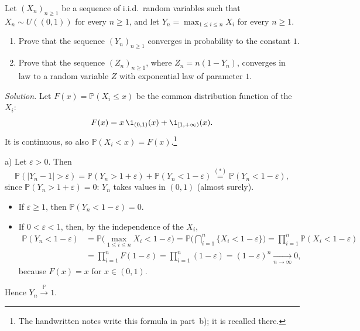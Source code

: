 \begin{example}\label{exa:cl-maximum}
Let $(X_n)_{n\ge1}$ be a sequence of i.i.d.\ random variables such that $X_n\sim U((0,1))$ for
every $n\ge1$, and let $Y_n=\max_{1\le i\le n}X_i$ for every $n\ge1$.
\begin{enumerate}[label=\alph*)]
  \item Prove that the sequence $(Y_n)_{n\ge1}$ converges in probability to the constant $1$.
  \item Prove that the sequence $(Z_n)_{n\ge1}$, where $Z_n=n(1-Y_n)$, converges in law to a
    random variable $Z$ with exponential law of parameter $1$.
\end{enumerate}

\emph{Solution.} Let $F(x)=\mathbb P(X_i\le x)$ be the common distribution function of the
$X_i$:
\[
  F(x)=x\,\1_{(0,1)}(x)+\1_{[1,+\infty)}(x).
\]
It is continuous, so also $\mathbb P(X_i<x)=F(x)$.\footnote{The handwritten notes write this
formula in part~b); it is recalled there.}

a) Let $\varepsilon>0$. Then
\[
  \mathbb P(|Y_n-1|>\varepsilon)=\mathbb P(Y_n>1+\varepsilon)+\mathbb P(Y_n<1-\varepsilon)
  \overset{(\ast)}{=}\mathbb P(Y_n<1-\varepsilon),
\]
since $\mathbb P(Y_n>1+\varepsilon)=0$: $Y_n$ takes values in $(0,1)$ (almost surely).
\begin{itemize}
  \item If $\varepsilon\ge1$, then $\mathbb P(Y_n<1-\varepsilon)=0$.
  \item If $0<\varepsilon<1$, then, by the independence of the $X_i$,
    \[
    \begin{aligned}
      \mathbb P(Y_n<1-\varepsilon)&=\mathbb P\Big(\max_{1\le i\le n}X_i<1-\varepsilon\Big)
      =\mathbb P\Big(\bigcap_{i=1}^n\{X_i<1-\varepsilon\}\Big)
      =\prod_{i=1}^n\mathbb P(X_i<1-\varepsilon)\\
      &=\prod_{i=1}^nF(1-\varepsilon)=\prod_{i=1}^n(1-\varepsilon)=(1-\varepsilon)^n\xrightarrow[n\to\infty]{}0,
    \end{aligned}
    \]
    because $F(x)=x$ for $x\in(0,1)$.
\end{itemize}
Hence $Y_n\xrightarrow{\mathbb P}1$.


\end{example}

